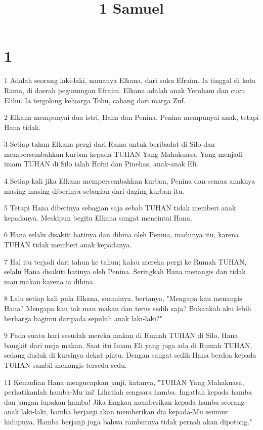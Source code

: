 

\title{1 Samuel}


\chapter{1}

\par 1 Adalah seorang laki-laki, namanya Elkana, dari suku Efraim. Ia tinggal di kota Rama, di daerah pegunungan Efraim. Elkana adalah anak Yeroham dan cucu Elihu. Ia tergolong keluarga Tohu, cabang dari marga Zuf.
\par 2 Elkana mempunyai dua istri, Hana dan Penina. Penina mempunyai anak, tetapi Hana tidak.
\par 3 Setiap tahun Elkana pergi dari Rama untuk beribadat di Silo dan mempersembahkan kurban kepada TUHAN Yang Mahakuasa. Yang menjadi imam TUHAN di Silo ialah Hofni dan Pinehas, anak-anak Eli.
\par 4 Setiap kali jika Elkana mempersembahkan kurban, Penina dan semua anaknya masing-masing diberinya sebagian dari daging kurban itu.
\par 5 Tetapi Hana diberinya sebagian saja sebab TUHAN tidak memberi anak kepadanya. Meskipun begitu Elkana sangat mencintai Hana.
\par 6 Hana selalu disakiti hatinya dan dihina oleh Penina, madunya itu, karena TUHAN tidak memberi anak kepadanya.
\par 7 Hal itu terjadi dari tahun ke tahun; kalau mereka pergi ke Rumah TUHAN, selalu Hana disakiti hatinya oleh Penina. Seringkali Hana menangis dan tidak mau makan karena ia dihina.
\par 8 Lalu setiap kali pula Elkana, suaminya, bertanya, "Mengapa kau menangis Hana? Mengapa kau tak mau makan dan terus sedih saja? Bukankah aku lebih berharga bagimu daripada sepuluh anak laki-laki?"
\par 9 Pada suatu hari sesudah mereka makan di Rumah TUHAN di Silo, Hana bangkit dari meja makan. Saat itu Imam Eli yang juga ada di Rumah TUHAN, sedang duduk di kursinya dekat pintu. Dengan sangat sedih Hana berdoa kepada TUHAN sambil menangis tersedu-sedu.
\par 11 Kemudian Hana mengucapkan janji, katanya, "TUHAN Yang Mahakuasa, perhatikanlah hamba-Mu ini! Lihatlah sengsara hamba. Ingatlah kepada hamba dan jangan lupakan hamba! Jika Engkau memberikan kepada hamba seorang anak laki-laki, hamba berjanji akan memberikan dia kepada-Mu seumur hidupnya. Hamba berjanji juga bahwa rambutnya tidak pernah akan dipotong."
